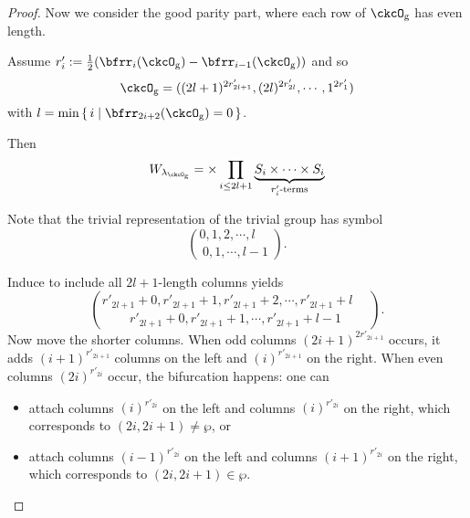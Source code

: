 \documentclass[12pt,a4paper]{amsart}
\numberwithin{equation}{section}
\theoremstyle{remark}
\def\half{{\tfrac{1}{2}}}
\def\lamckg{\lambda_{\ckcO_{\mathrm g}}}
\begin{document}
\begin{proof}
{{      Now we consider the good parity part, where each row of $\ckcO_{\mathrm g}$ has
      even length.

      Assume $r'_{i} := \half(\bfrr_{i}(\ckcO_{\mathrm g})-\bfrr_{i-1}(\ckcO_{\mathrm g}))$ and
      so
      \[
        \ckcO_{\mathrm g} %
        = ((2l+1)^{2r'_{2l+1}}, (2l)^{2r'_{2l}},\cdots, 1^{2r'_{1}})
      \]
      with $l =\min\set{i|\bfrr_{2i+2}(\ckcO_{\mathrm g}) = 0}$.

      Then
      \[
        W_{\lamckg} = \times \prod_{i\leq 2l+1} \underbrace{S_{i}\times \cdots\times S_{i}}_{r'_{i}\text{-terms}}
      \]

      Note that the trivial representation of the trivial group has symbol
      \[
        \binom{0,1, 2, \cdots, l\phantom{-1}}{0,1, \cdots, l-1}.
      \]


      Induce to include all $2l+1$-length columns yields
      \[
        \binom{r'_{2l+1}+0,r'_{2l+1}+1,r'_{2l+1}+2,\cdots, r'_{2l+1}+l\phantom{-1}}{ r'_{2l+1}+0,r'_{2l+1}+1, \cdots, r'_{2l+1}+l-1}.
      \]
      Now move the shorter columns. When odd columns $(2i+1)^{2r'_{2i+1}}$
      occurs, it adds $(i+1)^{r'_{2i+1}}$ columns on the left and
      $(i)^{r'_{2i+1}}$ on the right. When even columns $(2i)^{r'_{2i}}$ occur,
      the bifurcation happens: one can
      \begin{itemize}
        \item attach columns $(i)^{r'_{2i}}$ on the left and columns
              $(i)^{r'_{2i}}$ on the right, which corresponds to
              $(2i,2i+1)\neq \wp$, or
        \item attach columns $(i-1)^{r'_{2i}}$ on the left and columns
              $(i+1)^{r'_{2i}}$ on the right, which corresponds to
              $(2i,2i+1)\in \wp$.
      \end{itemize}


}}
\end{proof}
\end{document}
